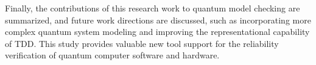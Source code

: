 Finally, the contributions of this research work to quantum model checking are summarized, and future work directions are discussed, such as incorporating more complex quantum system modeling and improving the representational capability of TDD. This study provides valuable new tool support for the reliability verification of quantum computer software and hardware.


\pagestyle{enfrontmatterstyle}%
\cleardoublepage\pagestyle{frontmatterstyle}%

